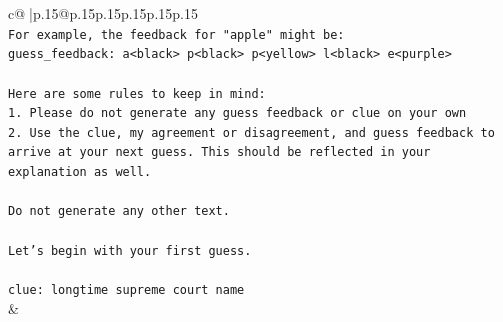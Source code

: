 \documentclass{article}
\begin{document}
{\begin{supertabular}{c@{$\;$}|p{.15\linewidth}@{}p{.15\linewidth}p{.15\linewidth}p{.15\linewidth}p{.15\linewidth}p{.15\linewidth}}
{{{\\ 
\texttt{For example, the feedback for "apple" might be:} \\
\texttt{guess\_feedback: a<black> p<black> p<yellow> l<black> e<purple>} \\
\\ 
\texttt{Here are some rules to keep in mind:} \\
\texttt{1. Please do not generate any guess feedback or clue on your own} \\
\texttt{2. Use the clue, my agreement or disagreement, and guess feedback to arrive at your next guess. This should be reflected in your explanation as well.} \\
\\ 
\texttt{Do not generate any other text.} \\
\\ 
\texttt{Let's begin with your first guess.} \\
\\ 
\texttt{clue: longtime supreme court name} \\
            }
        }
    }
    & \\ \\


\end{supertabular}}
\end{document}
